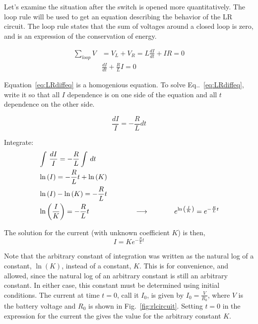 \documentclass[12pt]{article}
\begin{document}
\begin{flushleft}
Let's examine the situation after the switch is opened more quantitatively.  The loop rule will be used to get an equation describing the behavior of the LR circuit.  The loop rule states that the sum of voltages around a closed loop is zero, and is an expression of the conservation of energy.

\begin{eqnarray}
\sum_{loop} V & = V_{L} + V_{R} = L\frac{dI}{dt} +IR = 0  \nonumber \\
& \frac{dI}{dt} +\frac{R}{L}I = 0 
\label{eq:LRdiffeq}
\end{eqnarray}

Equation~\ref{eq:LRdiffeq} is a homogenious equation.  To solve Eq..~\ref{eq:LRdiffeq}, write it so that all $I$ dependence is on one side of the equation and all $t$ dependence on the other side. 

\[
\frac{dI}{I}=-\frac{R}{L}dt
\]

Integrate:
\begin{equation*}
\begin{aligned}
& \int \, \frac{dI}{I}=-\frac{R}{L}\int \, dt  \\
& \ln{(I)} = -\frac{R}{L}t + \ln{(K)} \\
& \ln{(I)}-\ln{(K)} = -\frac{R}{L}t  \\
& \ln{\left(\frac{I}{K}\right)} = -\frac{R}{L}t \hspace{.9in} \longrightarrow \hspace{.5in} e^{\ln{\left(\frac{I}{K}\right)}} = e^{-\frac{R}{L}t} 
\end{aligned}
\end{equation*}

The solution for the current (with unknown coefficient $K$) is then,
\begin{equation}
 I = K e^{-\frac{R}{L}t} 
\label{eq:solhomo}
\end{equation}

Note that the arbitrary constant of integration was written as the natural log of a constant, $\ln{(K)}$, instead of a constant, $K$.  This is for convenience, and allowed, since the natural log of an arbitrary constant is still an arbitrary constant.  In either case, this constant must be determined using initial conditions.  The current at time $t=0$, call it $I_{0}$, is given by $I_{0}=\frac{V}{R_{0}}$, where $V$ is the battery voltage and $R_{0}$ is shown in Fig.~\ref{fig:rlcircuit}.  Setting $t=0$ in the expression for the current the gives the value for the arbitrary constant $K$.


\end{flushleft}
\end{document}
